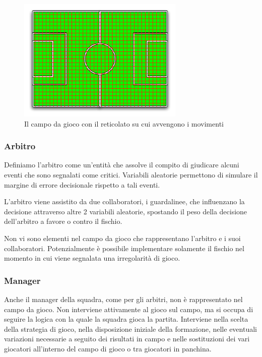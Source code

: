 \documentclass[aps,letterpaper,10pt]{article}
\begin{document}
\begin{figure}[H]
	\begin{center}
		\includegraphics[width=300px]{images/field-web.pdf}
	\end{center}
\caption{Il campo da gioco con il reticolato su cui avvengono i movimenti}
\end{figure}

\subsubsection{Arbitro}

Definiamo l'arbitro come un'entit\`a che assolve il compito di giudicare alcuni eventi che sono segnalati come critici. Variabili aleatorie permettono di simulare il margine di errore decisionale rispetto a tali eventi. \vspace{3mm}

L'arbitro viene assistito da due collaboratori, i guardalinee, che influenzano la decisione attraverso altre 2 variabili aleatorie, spostando il peso della decisione dell'arbitro a favore o contro il fischio. \vspace{3mm}

Non vi sono elementi nel campo da gioco che rappresentano l'arbitro e i suoi collaboratori. Potenzialmente \`e possibile implementare solamente il fischio nel momento in cui viene segnalata una irregolarit\`a di gioco.

\subsubsection{Manager}
\label{man}

Anche il manager della squadra, come per gli arbitri, non \`e rappresentato nel campo da gioco. Non interviene attivamente al gioco sul campo, ma si occupa di seguire la logica con la quale la squadra gioca la partita. Interviene nella scelta della strategia di gioco, nella disposizione iniziale della formazione, nelle eventuali variazioni necessarie a seguito dei risultati in campo e nelle sostituzioni dei vari giocatori all'interno del campo di gioco o tra giocatori in panchina. \vspace{3mm}
\end{document}
